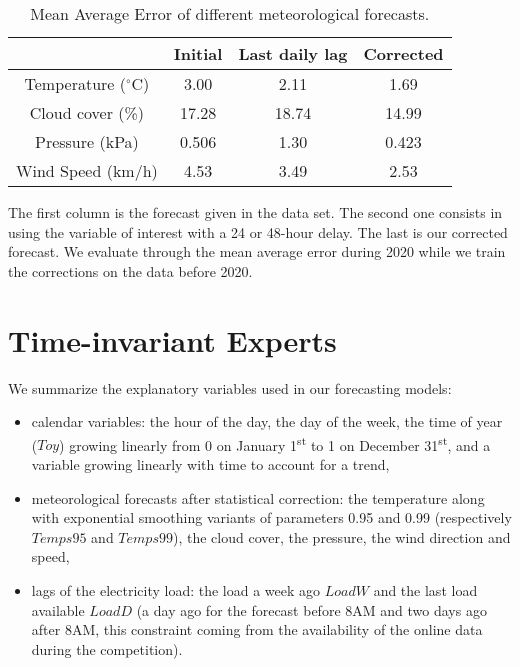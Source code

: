 \documentclass[transmag]{IEEEtran}
\begin{document}
\begin{table}
    \begin{center}
    \caption{Mean Average Error of different meteorological forecasts.}
    \label{tab:weather_correction}
    \begin{tabular}{|c c c c|}
        \hline
        & Initial & Last daily lag & Corrected \\
        \hline
        Temperature ($^\circ$C) & 3.00 & 2.11 & 1.69 \\
        \hline
        Cloud cover (\%) & 17.28 & 18.74 & 14.99 \\
        \hline
        Pressure (kPa) & 0.506 & 1.30 & 0.423 \\
        \hline
        Wind Speed (km/h) & 4.53 & 3.49 & 2.53 \\
        \hline
    \end{tabular}
    \end{center}
    The first column is the forecast given in the data set. The second one consists in using the variable of interest with a 24 or 48-hour delay. The last is our corrected forecast. We evaluate through the mean average error during 2020 while we train the corrections on the data before 2020.
\end{table}



\section{Time-invariant Experts}\label{sec:timeinvariant}
We summarize the explanatory variables used in our forecasting models:
\begin{itemize}
    \item 
    calendar variables: the hour of the day, the day of the week, the time of year ($Toy$) growing linearly from 0 on January 1\textsuperscript{st} to 1 on December 31\textsuperscript{st}, and a variable growing linearly with time to account for a trend,
    \item
    meteorological forecasts after statistical correction: the temperature along with exponential smoothing variants of parameters 0.95 and 0.99 (respectively $Temps95$ and $Temps99$), the cloud cover, the pressure, the wind direction and speed,
    \item
    lags of the electricity load: the load a week ago $LoadW$ and the last load available $LoadD$ (a day ago for the forecast before 8AM and two days ago after 8AM, this constraint coming from the availability of the online data during the competition).
\end{itemize}
\end{document}
